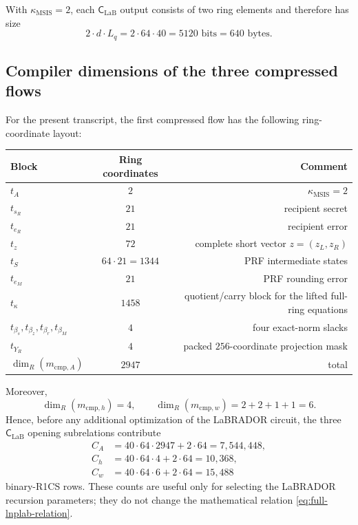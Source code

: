 \documentclass[11pt]{article}
\newcommand{\CLaB}{\mathsf C_{\mathrm{LaB}}}
\begin{document}
With $\kappa_{\mathrm{MSIS}}=2$, each $\CLaB$ output consists of two ring
elements and therefore has size
\[
  2\cdot d\cdot L_q
  =2\cdot64\cdot40
  =5120\text{ bits}=640\text{ bytes}.
\]


\subsection{Compiler dimensions of the three compressed flows}

For the present transcript, the first compressed flow has the following ring-coordinate
layout:
\begin{center}
\begin{tabular}{lcr}
\toprule
Block & Ring coordinates & Comment \\
\midrule
$t_A$ & $2$ & $\kappa_{\mathrm{MSIS}}=2$ \\
$t_{s_R}$ & $21$ & recipient secret \\
$t_{e_R}$ & $21$ & recipient error \\
$t_z$ & $72$ & complete short vector $z=(z_L,z_R)$ \\
$t_S$ & $64\cdot 21=1344$ & PRF intermediate states \\
$t_{e_M}$ & $21$ & PRF rounding error \\
$t_\kappa$ & $1458$ & quotient/carry block for the lifted full-ring equations \\
$t_{\beta_s},t_{\beta_z},t_{\beta_r},t_{\beta_M}$ & $4$ & four exact-norm slacks \\
$t_{Y_R}$ & $4$ & packed $256$-coordinate projection mask \\
\midrule
$\dim_R(m_{\mathrm{cmp},A})$ & $2947$ & total \\
\bottomrule
\end{tabular}
\end{center}
Moreover,
\[
  \dim_R(m_{\mathrm{cmp},h})=4,
  \qquad
  \dim_R(m_{\mathrm{cmp},w})=2+2+1+1=6.
\]
Hence, before any additional optimization of the LaBRADOR circuit, the three
$\CLaB$ opening subrelations contribute
\begin{align*}
 C_A&=40\cdot64\cdot2947+2\cdot64=7{,}544{,}448,\\
 C_h&=40\cdot64\cdot4+2\cdot64=10{,}368,\\
 C_w&=40\cdot64\cdot6+2\cdot64=15{,}488
\end{align*}
binary-R1CS rows.  These counts are useful only for selecting the LaBRADOR
recursion parameters; they do not change the mathematical relation
\eqref{eq:full-lnplab-relation}.
\end{document}

